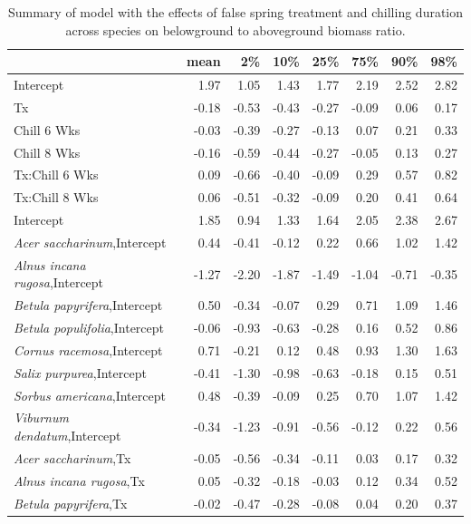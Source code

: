 \documentclass{article}\usepackage[]{graphicx}\usepackage[]{color}
\begin{document}
\newpage
\begin{longtable}{lrrrrrrr}
\caption{Summary of model with the effects of false spring treatment and chilling duration across species on belowground to aboveground biomass ratio.} \\ 
  \hline
 & mean & 2\% & 10\% & 25\% & 75\% & 90\% & 98\% \\ 
  \hline \endhead  \hline
Intercept & 1.97 & 1.05 & 1.43 & 1.77 & 2.19 & 2.52 & 2.82 \\ 
  Tx & -0.18 & -0.53 & -0.43 & -0.27 & -0.09 & 0.06 & 0.17 \\ 
  Chill 6 Wks & -0.03 & -0.39 & -0.27 & -0.13 & 0.07 & 0.21 & 0.33 \\ 
  Chill 8 Wks & -0.16 & -0.59 & -0.44 & -0.27 & -0.05 & 0.13 & 0.27 \\ 
  Tx:Chill 6 Wks & 0.09 & -0.66 & -0.40 & -0.09 & 0.29 & 0.57 & 0.82 \\ 
  Tx:Chill 8 Wks & 0.06 & -0.51 & -0.32 & -0.09 & 0.20 & 0.41 & 0.64 \\ 
  Intercept & 1.85 & 0.94 & 1.33 & 1.64 & 2.05 & 2.38 & 2.67 \\ 
  \textit{Acer saccharinum},Intercept & 0.44 & -0.41 & -0.12 & 0.22 & 0.66 & 1.02 & 1.42 \\ 
  \textit{Alnus incana rugosa},Intercept & -1.27 & -2.20 & -1.87 & -1.49 & -1.04 & -0.71 & -0.35 \\ 
  \textit{Betula papyrifera},Intercept & 0.50 & -0.34 & -0.07 & 0.29 & 0.71 & 1.09 & 1.46 \\ 
  \textit{Betula populifolia},Intercept & -0.06 & -0.93 & -0.63 & -0.28 & 0.16 & 0.52 & 0.86 \\ 
  \textit{Cornus racemosa},Intercept & 0.71 & -0.21 & 0.12 & 0.48 & 0.93 & 1.30 & 1.63 \\ 
  \textit{Salix purpurea},Intercept & -0.41 & -1.30 & -0.98 & -0.63 & -0.18 & 0.15 & 0.51 \\ 
  \textit{Sorbus americana},Intercept & 0.48 & -0.39 & -0.09 & 0.25 & 0.70 & 1.07 & 1.42 \\ 
  \textit{Viburnum dendatum},Intercept & -0.34 & -1.23 & -0.91 & -0.56 & -0.12 & 0.22 & 0.56 \\ 
  \textit{Acer saccharinum},Tx & -0.05 & -0.56 & -0.34 & -0.11 & 0.03 & 0.17 & 0.32 \\ 
  \textit{Alnus incana rugosa},Tx & 0.05 & -0.32 & -0.18 & -0.03 & 0.12 & 0.34 & 0.52 \\ 
  \textit{Betula papyrifera},Tx & -0.02 & -0.47 & -0.28 & -0.08 & 0.04 & 0.20 & 0.37 \\ 

\end{longtable}
\end{document}
